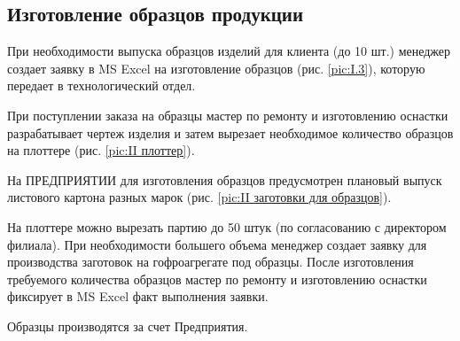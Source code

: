 \newpage
\subsection{Изготовление образцов продукции}
\label{bp:pattern}





При необходимости выпуска образцов изделий для клиента (до 10 шт.) менеджер создает заявку в MS Excel на изготовление образцов (рис. \ref{pic:I.3}), которую передает в технологический отдел. 

При поступлении заказа на образцы мастер по ремонту и изготовлению оснастки разрабатывает чертеж изделия и затем  вырезает необходимое количество образцов на плоттере (рис. \ref{pic:II плоттер}).

На ПРЕДПРИЯТИИ для изготовления образцов предусмотрен плановый выпуск листового картона разных марок (рис. \ref{pic:II заготовки для образцов}).   

На плоттере можно вырезать партию до 50 штук (по согласованию с директором филиала). При необходимости большего объема менеджер создает  заявку для производства заготовок на гофроагрегате под образцы.
После изготовления требуемого количества образцов мастер по ремонту и изготовлению оснастки фиксирует в MS Excel  факт выполнения заявки. 

Образцы производятся за счет Предприятия.

